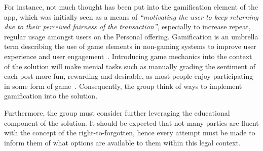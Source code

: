 For instance, not much thought has been put into the gamification element of the app, which was initially seen as a means of \emph{``motivating the user to keep returning due to their perceived fairness of the transaction''}, especially to increase repeat, regular usage amongst users on the Personal offering. Gamification is an umbrella term describing the use of game elements in non-gaming systems to improve user experience and user engagement~\parencite{deterding2011gamification}. Introducing game mechanics into the context of the solution will make menial tasks such as manually grading the sentiment of each post more fun, rewarding and desirable, as most people enjoy participating in some form of game~\parencite{hagglund2012taking}. Consequently, the group think of ways to implement gamification into the solution.

Furthermore, the group must consider further leveraging the educational component of the solution. It should be expected that not many parties are fluent with the concept of the right-to-forgotten, hence every attempt must be made to inform them of what options are available to them within this legal context.
